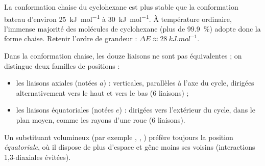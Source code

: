 \documentclass[11pt]{article}
\newcommand{\cle}[1]{{\popxbold\color{popdark}#1}}
\begin{document}
\begin{exemplebox}
La conformation chaise du cyclohexane est plus stable que la conformation bateau d'environ \SI{25}{kJ.mol^{-1}} à \SI{30}{kJ.mol^{-1}}. À température ordinaire, l'immense majorité des molécules de cyclohexane (plus de \SI{99,9}{\percent}) adopte donc la forme chaise. Retenir l'ordre de grandeur : $\Delta E \approx \SI{28}{kJ.mol^{-1}}$.
\end{exemplebox}

Dans la conformation chaise, les douze liaisons  ne sont pas équivalentes ; on distingue deux familles de positions :

\begin{itemize}
\item les liaisons \cle{axiales} (notées $a$) : verticales, parallèles à l'axe du cycle, dirigées alternativement vers le haut et vers le bas (6 liaisons) ;
\item les liaisons \cle{équatoriales} (notées $e$) : dirigées vers l'extérieur du cycle, dans le plan moyen, comme les rayons d'une roue (6 liaisons).
\end{itemize}

Un substituant volumineux (par exemple , , ) préfère toujours la position \emph{équatoriale}, où il dispose de plus d'espace et gêne moins ses voisins (interactions 1,3-diaxiales évitées).
\end{document}
